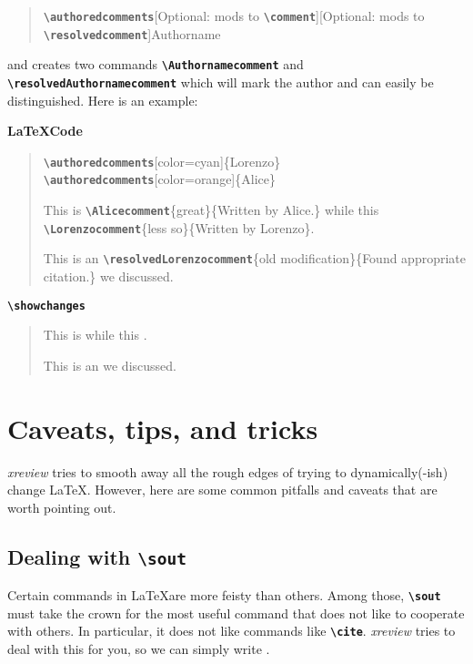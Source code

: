 \documentclass[a4paper]{ltxdoc}
\newcommand{\writecommand}[1]{\texttt{\textbf{{\textbackslash#1}}}}
\newcommand{\writearg}[1]{\{#1\}}
\begin{document}
\begin{quote}
    \writecommand{authoredcomments}[Optional: mods to \writecommand{comment}][Optional: mods to \writecommand{resolvedcomment}]{Authorname}
\end{quote}
\noindent
and creates two commands \writecommand{Authornamecomment} and \writecommand{resolvedAuthornamecomment} which will mark the author and can easily be distinguished.
Here is an example:

\textbf{\LaTeX Code}

\begin{quote}
    \writecommand{authoredcomments}[color=cyan]\writearg{Lorenzo}\newline
    \writecommand{authoredcomments}[color=orange]\writearg{Alice}\newline

    This is \writecommand{Alicecomment}\writearg{great}\writearg{Written by Alice.} while this \writecommand{Lorenzocomment}\writearg{less so}\writearg{Written by Lorenzo}.

    This is an \writecommand{resolvedLorenzocomment}\writearg{old modification}\writearg{Found appropriate citation.} we discussed.
\end{quote}

\writecommand{showchanges}
\showchanges

\begin{quote}
This is  while this .

This is an  we discussed.
\end{quote}

\section{Caveats, tips, and tricks}

\textit{xreview} tries to smooth away all the rough edges of trying to dynamically(-ish) change \LaTeX. However, here are some common pitfalls and caveats that are worth pointing out.

\subsection{Dealing with \writecommand{sout}}

Certain commands in \LaTeX are more feisty than others. Among those, \writecommand{sout} must take the crown for the most useful command that does not like to cooperate with others. In particular, it does not like commands like \writecommand{cite}.
\textit{xreview} tries to deal with this for you, so we can simply write .
\end{document}
